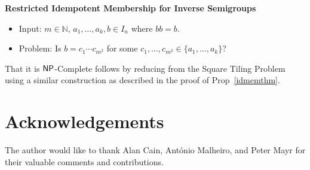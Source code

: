 \documentclass{amsart}
\newcommand{\NP}{\ensuremath\mathsf{NP}}
\theoremstyle{remark}
\numberwithin{equation}{section}
\begin{document}
\medskip
{\bf Restricted Idempotent Membership for Inverse Semigroups}
\begin{itemize}
\item Input: $m \in \mathbb{N}$, $a_1,\dots,a_k,b \in I_n$ where $bb = b$.
\item Problem: Is $b = c_1 \cdots c_{m^2}$ for some $c_1,\dots,c_{m^2} \in \{a_1,\dots,a_k\}$?
\end{itemize}

That it is $\NP$-Complete follows by reducing from the Square Tiling Problem using a similar construction as described in the proof of Prop~\ref{idmemthm}.

\section{Acknowledgements}
The author would like to thank Alan Cain, Ant\'onio Malheiro, and Peter Mayr for their valuable comments and contributions.
\end{document}
